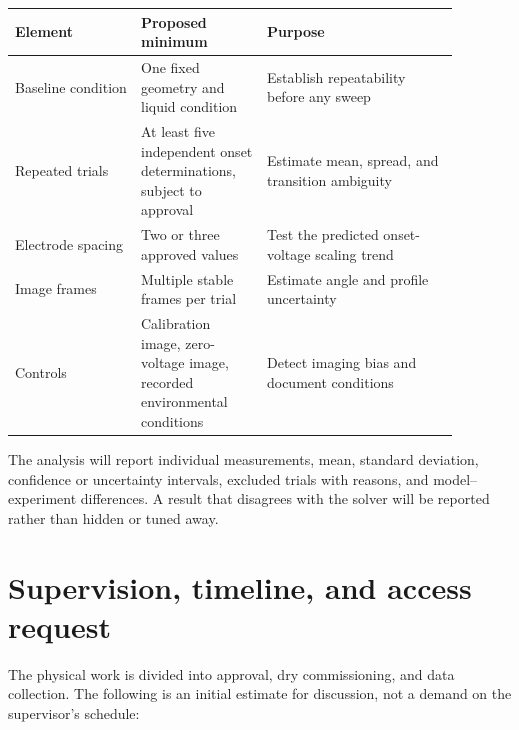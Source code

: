 \documentclass[11pt]{article}
\begin{document}
\begin{table}[h]
\centering
\small
\begin{tabular}{p{0.25\linewidth}p{0.25\linewidth}p{0.38\linewidth}}
\toprule
Element & Proposed minimum & Purpose \\
\midrule
Baseline condition & One fixed geometry and liquid condition & Establish repeatability before any sweep \\
Repeated trials & At least five independent onset determinations, subject to approval & Estimate mean, spread, and transition ambiguity \\
Electrode spacing & Two or three approved values & Test the predicted onset-voltage scaling trend \\
Image frames & Multiple stable frames per trial & Estimate angle and profile uncertainty \\
Controls & Calibration image, zero-voltage image, recorded environmental conditions & Detect imaging bias and document conditions \\
\bottomrule
\end{tabular}
\end{table}

The analysis will report individual measurements, mean, standard deviation, confidence or uncertainty intervals, excluded trials with reasons, and model--experiment differences. A result that disagrees with the solver will be reported rather than hidden or tuned away.

\section{Supervision, timeline, and access request}

The physical work is divided into approval, dry commissioning, and data collection. The following is an initial estimate for discussion, not a demand on the supervisor's schedule:
\end{document}
